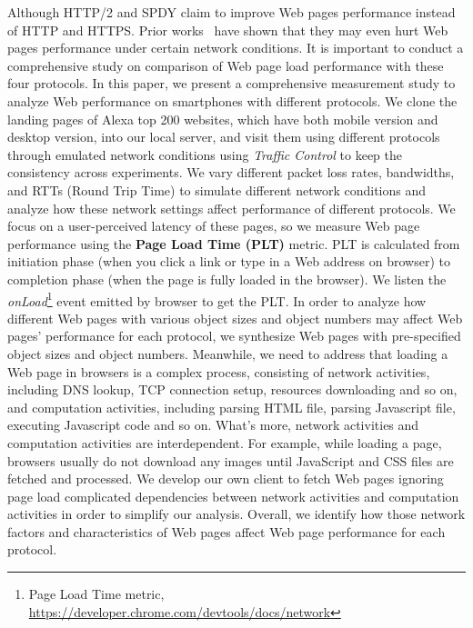 Although HTTP/2 and SPDY claim to improve Web pages performance instead of HTTP and HTTPS. Prior works~\cite{Wang:NSDI14,Saxce:INFCOM15, Varvello:CORR15, Erman:CONEXT13, El-khatibTW:IFIP14} have shown that they may even hurt Web pages performance under certain network conditions. It is important to conduct a comprehensive study on comparison of Web page load performance with these four protocols. In this paper, we present a comprehensive measurement study to analyze Web performance on smartphones with different protocols. We clone the landing pages of Alexa top 200 websites, which have both mobile version and desktop version, into our local server, and visit them using different protocols through emulated network conditions using \textit{Traffic Control} to keep the consistency across experiments. We vary different packet loss rates, bandwidths, and RTTs (Round Trip Time) to simulate different network conditions and analyze how these network settings affect performance of different protocols. We focus on a user-perceived latency of these pages, so we measure Web page performance using the \textbf{Page Load Time (PLT)} metric. PLT is calculated from initiation phase (when you click a link or type in a Web address on browser) to completion phase (when the page is fully loaded in the browser). We listen the \textit{onLoad}\footnote{Page Load Time metric, \url{https://developer.chrome.com/devtools/docs/network}} event emitted by browser to get the PLT. In order to analyze how different Web pages with various object sizes and object numbers may affect Web pages' performance for each protocol, we synthesize Web pages with pre-specified object sizes and object numbers. Meanwhile, we need to address that loading a Web page in browsers is a complex process, consisting of network activities, including DNS lookup, TCP connection setup, resources downloading and so on, and computation activities, including parsing HTML file, parsing Javascript file, executing Javascript code and so on. What's more, network activities and computation activities are interdependent. For example, while loading a page, browsers usually do not download any images until JavaScript and CSS files are fetched and processed. We develop our own client to fetch Web pages ignoring page load complicated dependencies between network activities and computation activities in order to simplify our analysis. Overall, we identify how those network factors and characteristics of Web pages affect Web page performance for each protocol. 

